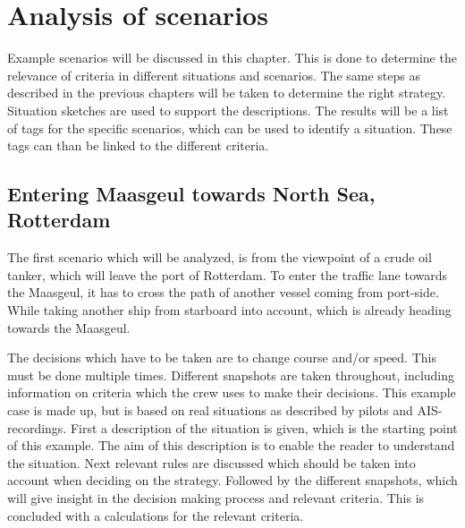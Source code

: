 \chapter{Analysis of scenarios}
\label{ch:scenario-examples}
Example scenarios will be discussed in this chapter. This is done to determine the relevance of criteria in different situations and scenarios. The same steps as described in the previous chapters will be taken to determine the right strategy. Situation sketches are used to support the descriptions. The results will be a list of tags for the specific scenarios, which can be used to identify a situation. These tags can than be linked to the different criteria.

\section{Entering Maasgeul towards North Sea, Rotterdam}
The first scenario which will be analyzed, is from the viewpoint of a crude oil tanker, which will leave the port of Rotterdam. To enter the traffic lane towards the Maasgeul, it has to cross the path of another vessel coming from port-side. While taking another ship from starboard into account, which is already heading towards the Maasgeul.

The decisions which have to be taken are to change course and/or speed. This must be done multiple times. Different snapshots are taken throughout, including information on criteria which the crew uses to make their decisions.
This example case is made up, but is based on real situations as described by pilots and \ac{AIS}-recordings.
First a description of the situation is given, which is the starting point of this example. The aim of this description is to enable the reader to understand the situation.
Next relevant rules are discussed which should be taken into account when deciding on the strategy.
Followed by the different snapshots, which will give insight in the decision making process and relevant criteria. This is concluded with a calculations for the relevant criteria.

